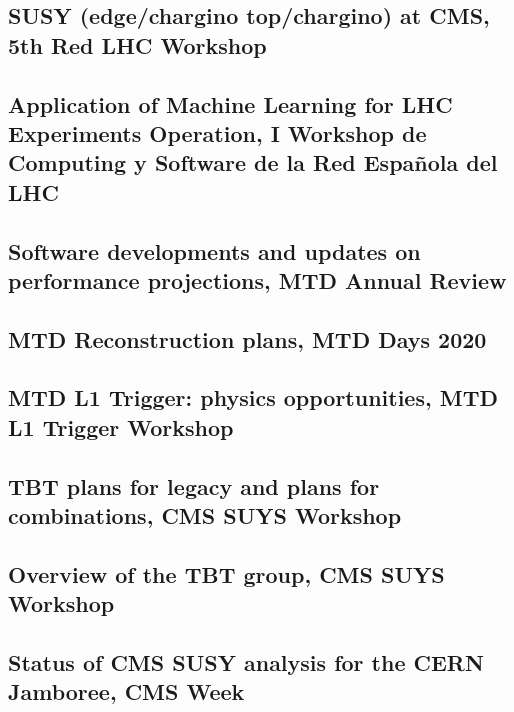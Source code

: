 \documentclass[a4paper, 11pt, twoside, openright]{report}
\begin{document}
\subsection{SUSY (edge/chargino top/chargino) at CMS, 5th Red LHC Workshop}


\subsection{Application of Machine Learning for LHC Experiments Operation, I Workshop de Computing y Software de la Red Española del LHC}


\subsection{Software developments and updates on performance projections, MTD Annual Review}


\subsection{MTD Reconstruction plans, MTD Days 2020}


\subsection{MTD L1 Trigger: physics opportunities, MTD L1 Trigger Workshop}


\subsection{TBT plans for legacy and plans for combinations, CMS SUYS Workshop}


\subsection{Overview of the TBT group, CMS SUYS Workshop}


\subsection{Status of CMS SUSY analysis for the CERN Jamboree, CMS Week}

\end{document}
